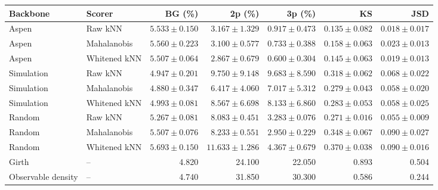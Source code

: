 \begin{tabular}{llrrrrr}
\toprule
Backbone & Scorer & BG (\%) & 2p (\%) & 3p (\%) & KS & JSD \\
\midrule
Aspen & Raw kNN & $5.533\pm0.150$ & $3.167\pm1.329$ & $0.917\pm0.473$ & $0.135\pm0.082$ & $0.018\pm0.017$ \\
Aspen & Mahalanobis & $5.560\pm0.223$ & $3.100\pm0.577$ & $0.733\pm0.388$ & $0.158\pm0.063$ & $0.023\pm0.013$ \\
Aspen & Whitened kNN & $5.507\pm0.064$ & $2.867\pm0.679$ & $0.600\pm0.304$ & $0.145\pm0.063$ & $0.019\pm0.013$ \\
Simulation & Raw kNN & $4.947\pm0.201$ & $9.750\pm9.148$ & $9.683\pm8.590$ & $0.318\pm0.062$ & $0.068\pm0.022$ \\
Simulation & Mahalanobis & $4.880\pm0.347$ & $6.417\pm4.060$ & $7.017\pm5.312$ & $0.279\pm0.043$ & $0.058\pm0.020$ \\
Simulation & Whitened kNN & $4.993\pm0.081$ & $8.567\pm6.698$ & $8.133\pm6.860$ & $0.283\pm0.053$ & $0.058\pm0.025$ \\
Random & Raw kNN & $5.267\pm0.081$ & $8.083\pm0.451$ & $3.283\pm0.076$ & $0.271\pm0.016$ & $0.055\pm0.009$ \\
Random & Mahalanobis & $5.507\pm0.076$ & $8.233\pm0.551$ & $2.950\pm0.229$ & $0.348\pm0.067$ & $0.090\pm0.027$ \\
Random & Whitened kNN & $5.693\pm0.150$ & $11.633\pm1.286$ & $4.367\pm0.679$ & $0.370\pm0.038$ & $0.090\pm0.016$ \\
Girth & -- & 4.820 & 24.100 & 22.050 & 0.893 & 0.504 \\
Observable density & -- & 4.740 & 31.850 & 30.300 & 0.586 & 0.244 \\
\bottomrule
\end{tabular}
